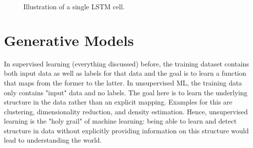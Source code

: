 \begin{figure}
			\caption{Illustration of a single LSTM cell.}
			\label{fig:lstmCell}
		\end{figure}

\chapter{Generative Models}
	In supervised learning (everything discussed) before, the training dataset contains both input data as well as labels for that data and the goal is to learn a function that maps from the former to the latter. In unsupervised ML, the training data only contains "input" data and no labels. The goal here is to learn the underlying structure in the data rather than an explicit mapping. Examples for this are clustering, dimensionality reduction, and density estimation. Hence, unsupervised learning is the "holy grail" of machine learning: being able to learn and detect structure in data without explicitly providing information on this structure would lead to understanding the world.

